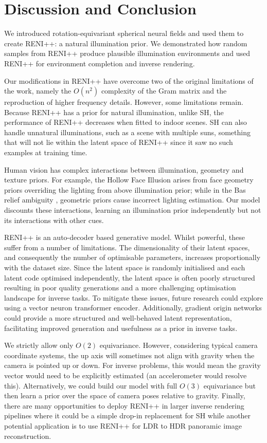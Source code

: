 \section{Discussion and Conclusion}
We introduced rotation-equivariant spherical neural fields and used them to create RENI++: a natural illumination prior. We demonstrated how random samples from RENI++ produce plausible illumination environments and used RENI++ for environment completion and inverse rendering. 

Our modifications in RENI++ have overcome two of the original limitations of the work, namely the \(O(n^{2})\) complexity of the Gram matrix and the reproduction of higher frequency details. However, some limitations remain. Because RENI++ has a prior for natural illumination, unlike SH, the performance of RENI++ decreases when fitted to indoor scenes. SH can also handle unnatural illuminations, such as a scene with multiple suns, something that will not lie within the latent space of RENI++ since it saw no such examples at training time. 

Human vision has complex interactions between illumination, geometry and texture priors. For example, the Hollow Face Illusion \cite{hill_independent_1993} arises from face geometry priors overriding the lighting from above illumination prior; while in the Bas relief ambiguity \cite{belhumeur_bas-relief_1999}, geometric priors cause incorrect lighting estimation. Our model discounts these interactions, learning an illumination prior independently but not its interactions with other cues. 

RENI++ is an auto-decoder based generative model. Whilst powerful, these suffer from a number of limitations. The dimensionality of their latent spaces, and consequently the number of optimisable parameters, increases proportionally with the dataset size. Since the latent space is randomly initialised and each latent code optimised independently, the latent space is often poorly structured resulting in poor quality generations and a more challenging optimisation landscape for inverse tasks. To mitigate these issues, future research could explore using a vector neuron transformer encoder. Additionally, gradient origin networks could provide a more structured and well-behaved latent representation, facilitating improved generation and usefulness as a prior in inverse tasks.

We strictly allow only $O(2)$ equivariance. However, considering typical camera coordinate systems, the up axis will sometimes not align with gravity when the camera is pointed up or down. For inverse problems, this would mean the gravity vector would need to be explicitly estimated (an accelerometer would resolve this). Alternatively, we could build our model with full $O(3)$ equivariance but then learn a prior over the space of camera poses relative to gravity. Finally, there are many opportunities to deploy RENI++ in larger inverse rendering pipelines where it could be a simple drop-in replacement for SH while another potential application is to use RENI++ for LDR to HDR panoramic image reconstruction. 